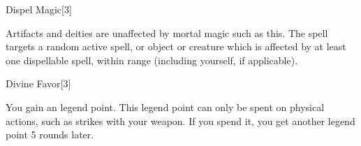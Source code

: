 \begin{spellsection}{Dispel Magic}[3]
\begin{spellfooter}
        Artifacts and deities are unaffected by mortal magic such as this.
         The spell targets a random active spell, or object or creature which is affected by at least one dispellable spell, within range (including yourself, if applicable).
    \end{spellfooter}
    \begin{spellaugments}
    \end{spellaugments}
\end{spellsection}

\begin{spellsection}{Divine Favor}[3]
    \begin{spellheader}
    \end{spellheader}
    \begin{spellcontent}
        \begin{spelltargetinginfo}
        \end{spelltargetinginfo}
        \begin{spelleffects}
            \spelleffect You gain an legend point.
            This legend point can only be spent on physical actions, such as strikes with your weapon.
            If you spend it, you get another legend point 5 rounds later.
            \spelldur \durlong \dismissable
        \end{spelleffects}
    \end{spellcontent}
    \begin{spellfooter}
        \miscastexplode
    \end{spellfooter}
    \begin{spellaugments}
    \end{spellaugments}
\end{spellsection}

